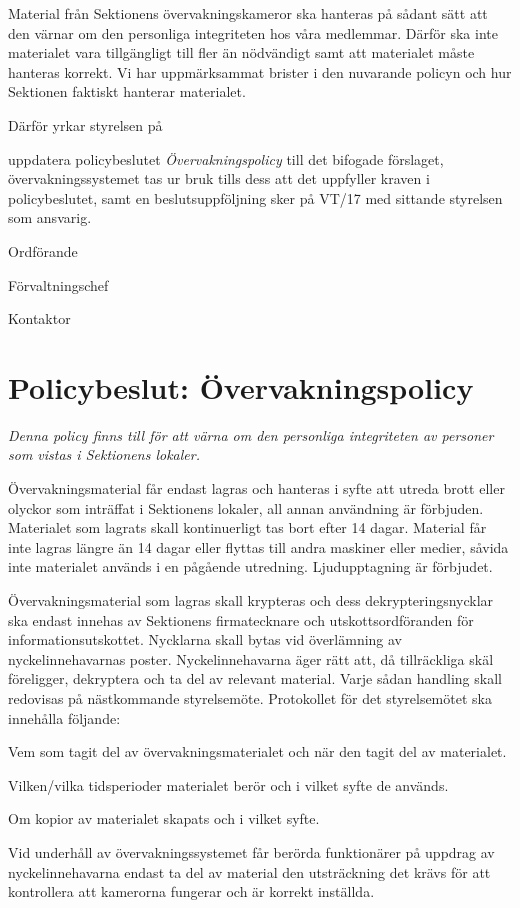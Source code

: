 \documentclass[../_main/handlingar.tex]{subfiles}
\begin{document}

Material från Sektionens övervakningskameror ska hanteras på sådant sätt att den värnar om den personliga integriteten hos våra medlemmar. Därför ska inte materialet vara tillgängligt till fler än nödvändigt samt att materialet måste hanteras korrekt. Vi har uppmärksammat brister i den nuvarande policyn och hur Sektionen faktiskt hanterar materialet.

Därför yrkar styrelsen på

\begin{attsatser}
    \att uppdatera policybeslutet \emph{Övervakningspolicy} till det bifogade förslaget,
    \att övervakningssystemet tas ur bruk tills dess att det uppfyller kraven i policybeslutet, samt
    \att en beslutsuppföljning sker på VT/17 med sittande styrelsen som ansvarig.
\end{attsatser}

\begin{signatures}{3}
    \ist
    \signature{\ordf}{Ordförande}
    \signature{Anders Nilsson}{Förvaltningschef}
    \signature{\sekr}{Kontaktor}
\end{signatures}

\newpage
\section*{Policybeslut: Övervakningspolicy}
\emph{Denna policy finns till för att värna om den personliga integriteten av personer som vistas i Sektionens lokaler.}

Övervakningsmaterial får endast lagras och hanteras i syfte att utreda brott eller olyckor som inträffat i Sektionens lokaler, all annan användning är förbjuden. Materialet som lagrats skall kontinuerligt tas bort efter 14 dagar. Material får inte lagras längre än 14 dagar eller flyttas till andra maskiner eller medier, såvida inte materialet används i en pågående utredning. Ljudupptagning är förbjudet.

Övervakningsmaterial som lagras skall krypteras och dess dekrypteringsnycklar ska endast innehas av Sektionens firmatecknare och utskottsordföranden för informationsutskottet. Nycklarna skall bytas vid överlämning av nyckelinnehavarnas poster. Nyckelinnehavarna äger rätt att, då tillräckliga skäl föreligger, dekryptera och ta del av relevant material. Varje sådan handling skall redovisas på nästkommande styrelsemöte. Protokollet för det styrelsemötet ska innehålla följande:
\begin{dashlist}
    \item Vem som tagit del av övervakningsmaterialet och när den tagit del av materialet.
    \item Vilken/vilka tidsperioder materialet berör och i vilket syfte de används.
    \item Om kopior av materialet skapats och i vilket syfte.
\end{dashlist}

Vid underhåll av övervakningssystemet får berörda funktionärer på uppdrag av nyckelinnehavarna endast ta del av material den utsträckning det krävs för att kontrollera att kamerorna fungerar och är korrekt inställda.
\end{document}
